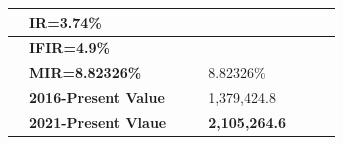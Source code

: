 \documentclass[12pt]{article}
\begin{document}
\begin{table}[htbp]
\begin{tabular}{l|l|l|l|l|l|l|l}
    \hline
    \rowcolor[rgb]{ .973,  .796,  .678}       & \textbf{ IR=3.74\% } &       &       &       &       &       &  \\
    \hline
    \rowcolor[rgb]{ .988,  .894,  .839}       & \textbf{ IFIR=4.9\% } &       &       &       &       &       &  \\
    \hline
    \rowcolor[rgb]{ .973,  .796,  .678}       & \textbf{MIR=8.82326\%} &       &       & 8.82326\% &       &       &  \\
    \hline
    \rowcolor[rgb]{ .988,  .894,  .839}       & \textbf{2016-Present Value} &       &       &       1,379,424.8  &       &       &  \\
    \hline
    \rowcolor[rgb]{ .973,  .796,  .678}       & \textbf{2021-Present Vlaue} &       &       & \textcolor[rgb]{ 1,  0,  0}{\textbf{   2,105,264.6 }} &       &       &  \\
    \end{tabular}%
  \label{tab:addlabel}%
\end{table}%
\end{document}
